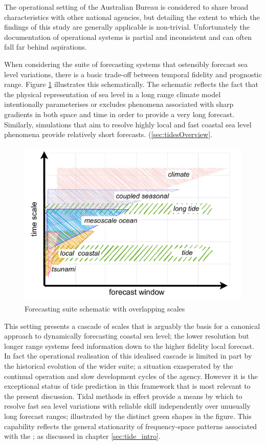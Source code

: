 The operational setting of the Australian Bureau is considered to share broad characteristics with other national agencies, but detailing the extent to which the findings of this study are generally applicable is non-trivial.    
Unfortunately the documentation of operational systems is partial and inconsistent and can often fall far behind aspirations.  

When considering the suite of forecasting systems that ostensibly forecast sea level variations, there is a basic trade-off between temporal fidelity and prognostic range.    Figure \ref{fig:forecastScalesAll} illustrates this schematically.    The schematic reflects the fact that the physical representation of sea level in a long range climate model intentionally parameterises or excludes phenomena associated with sharp gradients in both space and time in order to provide a very long forecast.  Similarly, simulations that aim to resolve highly local and fast coastal sea level phenomena provide relatively short forecasts.    
(\ref{sec:tidesOverview}.    
\begin{figure}[H]\centering
  \includegraphics[width=\figwidthBig]{figures/diagrams/scales.pdf}
  \caption{Forecasting suite schematic with overlapping scales}
  \label{fig:forecastScalesAll}
\end{figure}
This setting presents a cascade of scales that is arguably the basis for a canonical approach to dynamically forecasting coastal sea level; the lower resolution but longer range systems feed information down to the higher fidelity local forecast.    In fact the operational realisation of this idealised cascade is limited in part by the historical evolution of the wider suite; a situation exasperated by the continual operation and slow development cycles of the agency. 
However it is the exceptional status of tide prediction in this framework that is most relevant to the present discussion.  Tidal methods in effect provide a means by which to resolve fast sea level variations with reliable skill independently over unusually long forecast ranges; illustrated by the distinct green shapes in the figure.    This capability reflects the general stationarity of frequency-space patterns associated with the \ATGP{}; as discussed in chapter \ref{sec:tide_intro}.

